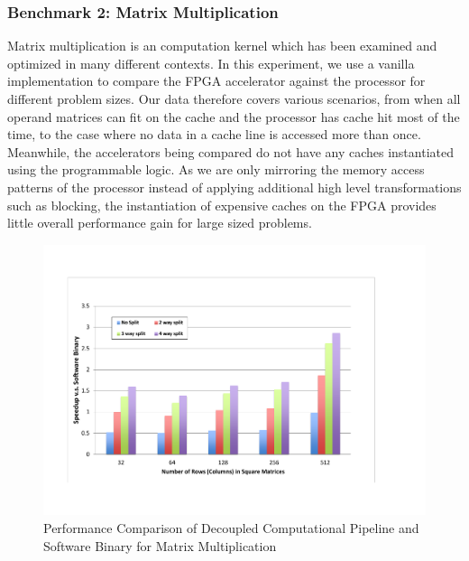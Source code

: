 \subsubsection{Benchmark 2: Matrix Multiplication}
Matrix multiplication is an computation kernel which has been examined and optimized in many different contexts. %
In this experiment, we use a vanilla implementation to compare the FPGA accelerator against the processor for different problem sizes. Our data therefore covers various scenarios, from when all operand matrices can fit on the cache and the processor has cache hit most of the time, to the case where no data in a cache line is accessed more than once. 
Meanwhile, the accelerators being compared do not have any caches instantiated using the programmable logic. As we are only mirroring the memory access patterns of the processor instead of applying additional high level transformations such as blocking, the instantiation of expensive caches on the FPGA provides little overall performance gain for large sized problems. 

\begin{figure}[htp]
\begin{center}
\includegraphics[width=1.0\linewidth]{chap6fig/mmultPerfSinglePort.pdf}
\caption{Performance Comparison of Decoupled Computational Pipeline and Software Binary for Matrix Multiplication
\label{fig:mmPerf}}
\end{center}
\end{figure}

